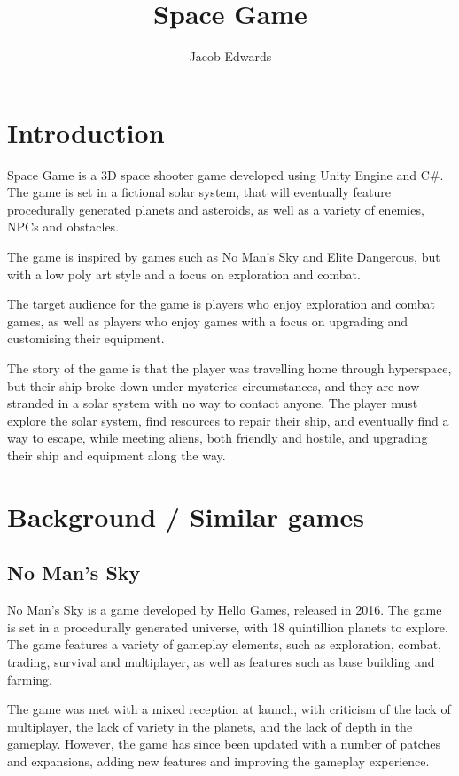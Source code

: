 \documentclass[final]{cmpreport}
\title{Space Game}
\author{Jacob Edwards}
\begin{document}
    \section{Introduction}\label{sec:introduction}

    Space Game is a 3D space shooter game developed using Unity Engine\citep{unity:home} and C\#\citep{csharp:home}.
    The game is set in a fictional solar system, that will eventually feature procedurally generated planets and
    asteroids, as well as a variety of enemies, NPCs and obstacles.

    The game is inspired by games such as No Man's Sky\citep{hellogames:nms} and Elite Dangerous\citep{frontier:ed},
    but with a low poly art style and a focus on exploration and combat.

    The target audience for the game is players who enjoy exploration and combat games, as well as players who enjoy
    games with a focus on upgrading and customising their equipment.

    The story of the game is that the player was travelling home through hyperspace, but their ship broke down under
    mysteries circumstances, and they are now stranded in a solar system with no way to contact anyone.
    The player must explore the solar system, find resources to repair their ship, and eventually find a way to
    escape, while meeting aliens, both friendly and hostile, and upgrading their ship and equipment along the way.

    \section{Background / Similar games}\label{sec:background}

    \subsection{No Man's Sky}\label{subsec:nms}

    No Man's Sky is a game developed by Hello Games\citep{hellogames:nms}, released in 2016.
    The game is set in a procedurally generated universe, with 18 quintillion planets to explore.
    The game features a variety of gameplay elements, such as exploration, combat, trading, survival and
    multiplayer, as well as features such as base building and farming.

    The game was met with a mixed reception at launch, with criticism of the lack of multiplayer, the lack of variety
    in the planets, and the lack of depth in the gameplay.
    However, the game has since been updated with a number of patches and expansions, adding new features and improving
    the gameplay experience.
\end{document}
